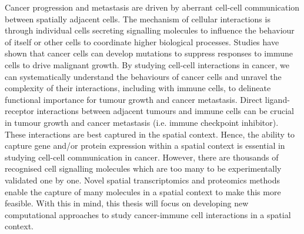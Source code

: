 

%

%





\noindent
Cancer progression and metastasis are driven by aberrant cell-cell communication between spatially adjacent cells. The mechanism of cellular interactions is through individual cells secreting signalling molecules to influence the behaviour of itself or other cells to coordinate higher biological processes. Studies have shown that cancer cells can develop mutations to suppress responses to immune cells to drive malignant growth. By studying cell-cell interactions in cancer, we can systematically understand the behaviours of cancer cells and unravel the complexity of their interactions, including with immune cells, to delineate functional importance for tumour growth and cancer metastasis. Direct ligand-receptor interactions between adjacent tumours and immune cells can be crucial in tumour growth and cancer metastasis (i.e. immune checkpoint inhibitor). These interactions are best captured in the spatial context. Hence, the ability to capture gene and/or protein expression within a spatial context is essential in studying cell-cell communication in cancer. However, there are thousands of recognised cell signalling molecules which are too many to be experimentally validated one by one. Novel spatial transcriptomics and proteomics methods enable the capture of many molecules in a spatial context to make this more feasible. With this in mind, this thesis will focus on developing new computational approaches to study cancer-immune cell interactions in a spatial context.

